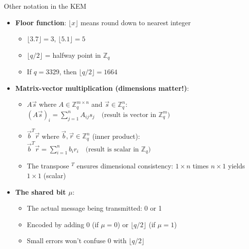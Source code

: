 \ifdefined\PRESENTATION\else\PassOptionsToClass{handout}{beamer}\fi\documentclass[aspectratio=169, lualatex]{beamer}
\begin{document}
\begin{frame}{Other notation in the KEM}
	\begin{itemize}
		\item \textbf{Floor function}: $\lfloor x \rfloor$ means round down to nearest integer
		      \begin{itemize}
			      \item $\lfloor 3.7 \rfloor = 3$, $\lfloor 5.1 \rfloor = 5$
			      \item $\lfloor q/2 \rfloor$ = halfway point in $\mathbb{Z}_q$
			      \item If $q = 3329$, then $\lfloor q/2 \rfloor = 1664$
		      \end{itemize}
		\item \textbf{Matrix-vector multiplication (dimensions matter!)}:
		      \begin{itemize}
			      \item $A\vec{s}$ where $A \in \mathbb{Z}_q^{m \times n}$ and $\vec{s} \in \mathbb{Z}_q^n$:
			            $(A\vec{s})_i = \sum_{j=1}^n A_{ij}s_j \quad \text{(result is vector in $\mathbb{Z}_q^m$)}$
			      \item $\vec{b}^T\vec{r}$ where $\vec{b}, \vec{r} \in \mathbb{Z}_q^n$ (inner product):
			            $\vec{b}^T\vec{r} = \sum_{i=1}^n b_i r_i \quad \text{(result is scalar in $\mathbb{Z}_q$)}$

			      \item The transpose ${}^T$ ensures dimensional consistency: $1 \times n$ times $n \times 1$ yields $1 \times 1$ (scalar)
		      \end{itemize}
		\item \textbf{The shared bit $\mu$}:
		      \begin{itemize}
			      \item The actual message being transmitted: 0 or 1
			      \item Encoded by adding 0 (if $\mu = 0$) or $\lfloor q/2 \rfloor$ (if $\mu = 1$)
			      \item Small errors won't confuse 0 with $\lfloor q/2 \rfloor$
		      \end{itemize}
	\end{itemize}
\end{frame}
\end{document}
